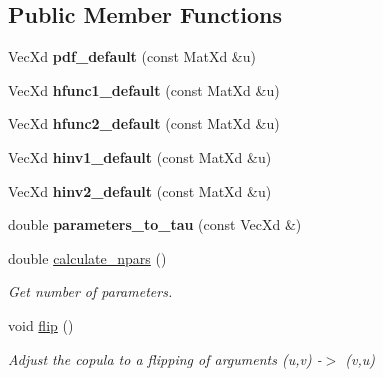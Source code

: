 \subsection*{Public Member Functions}
\begin{DoxyCompactItemize}
\item 
Vec\+Xd {\bfseries pdf\+\_\+default} (const Mat\+Xd \&u)\hypertarget{class_kernel_bicop_aa5c384abe680e15e68ee753ba07383b9}{}\label{class_kernel_bicop_aa5c384abe680e15e68ee753ba07383b9}

\item 
Vec\+Xd {\bfseries hfunc1\+\_\+default} (const Mat\+Xd \&u)\hypertarget{class_kernel_bicop_a813b02c149cdfdecd19f7d75b48a5750}{}\label{class_kernel_bicop_a813b02c149cdfdecd19f7d75b48a5750}

\item 
Vec\+Xd {\bfseries hfunc2\+\_\+default} (const Mat\+Xd \&u)\hypertarget{class_kernel_bicop_a50d6ee40f8ad1cacf26207aeca593ce7}{}\label{class_kernel_bicop_a50d6ee40f8ad1cacf26207aeca593ce7}

\item 
Vec\+Xd {\bfseries hinv1\+\_\+default} (const Mat\+Xd \&u)\hypertarget{class_kernel_bicop_aef4490ec07370b9d94da42ffc66472bb}{}\label{class_kernel_bicop_aef4490ec07370b9d94da42ffc66472bb}

\item 
Vec\+Xd {\bfseries hinv2\+\_\+default} (const Mat\+Xd \&u)\hypertarget{class_kernel_bicop_aaa8f2330ce0be70f2963ad2c9fbe3bc9}{}\label{class_kernel_bicop_aaa8f2330ce0be70f2963ad2c9fbe3bc9}

\item 
double {\bfseries parameters\+\_\+to\+\_\+tau} (const Vec\+Xd \&)\hypertarget{class_kernel_bicop_a75af40b7db1c24278ea373f0633a9b22}{}\label{class_kernel_bicop_a75af40b7db1c24278ea373f0633a9b22}

\item 
double \hyperlink{class_kernel_bicop_a631fd1cf2a05f30353ed9048839fae85}{calculate\+\_\+npars} ()\hypertarget{class_kernel_bicop_a631fd1cf2a05f30353ed9048839fae85}{}\label{class_kernel_bicop_a631fd1cf2a05f30353ed9048839fae85}

\begin{DoxyCompactList}\small\item\em Get number of parameters. \end{DoxyCompactList}\item 
void \hyperlink{class_kernel_bicop_a671e7f0f6d43e4eed35aceda3f70ab58}{flip} ()\hypertarget{class_kernel_bicop_a671e7f0f6d43e4eed35aceda3f70ab58}{}\label{class_kernel_bicop_a671e7f0f6d43e4eed35aceda3f70ab58}

\begin{DoxyCompactList}\small\item\em Adjust the copula to a flipping of arguments (u,v) -\/$>$ (v,u) \end{DoxyCompactList}\end{DoxyCompactItemize}
